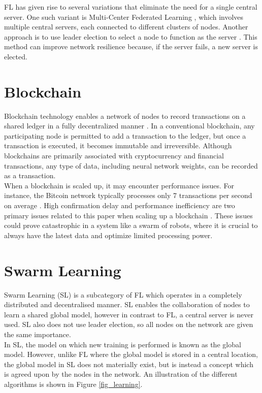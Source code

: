 FL has given rise to several variations that eliminate the need for a single central server. One such variant is Multi-Center Federated Learning \cite{multi_center_fed_learning}, which involves multiple central servers, each connected to different clusters of nodes. Another approach is to use leader election to select a node to function as the server \cite{fed_leaderelec}. This method can improve network resilience because, if the server fails, a new server is elected.

\section{Blockchain} \label{bg:bc}
Blockchain technology enables a network of nodes to record transactions on a shared ledger in a fully decentralized manner \cite{blockchain_review}. In a conventional blockchain, any participating node is permitted to add a transaction to the ledger, but once a transaction is executed, it becomes immutable and irreversible. Although blockchains are primarily associated with cryptocurrency and financial transactions, any type of data, including neural network weights, can be recorded as a transaction. \\

When a blockchain is scaled up, it may encounter performance issues. For instance, the Bitcoin network typically processes only 7 transactions per second on average \cite{blockchain_scale}. High confirmation delay and performance inefficiency are two primary issues related to this paper when scaling up a blockchain \cite{blockchain_scale}. These issues could prove catastrophic in a system like a swarm of robots, where it is crucial to always have the latest data and optimize limited processing power.

\section{Swarm Learning}
Swarm Learning (SL) is a subcategory of FL which operates in a completely distributed and decentralised manner. SL enables the collaboration of nodes to learn a shared global model, however in contrast to FL, a central server is never used. SL also does not use leader election, so all nodes on the network are given the same importance. \\

In SL, the model on which new training is performed is known as the global model. However, unlike FL where the global model is stored in a central location, the global model in SL does not materially exist, but is instead a concept which is agreed upon by the nodes in the network. An illustration of the different algorithms is shown in Figure \ref{fig_learning}. \\

